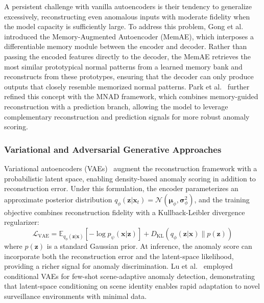 \documentclass[10pt,a4paper]{article}
\begin{document}
A persistent challenge with vanilla autoencoders is their tendency to generalize excessively, reconstructing even anomalous inputs with moderate fidelity when the model capacity is sufficiently large. To address this problem, Gong et al.~\citeyearpar{gong2019memorizing} introduced the Memory-Augmented Autoencoder (MemAE), which interposes a differentiable memory module between the encoder and decoder. Rather than passing the encoded features directly to the decoder, the MemAE retrieves the most similar prototypical normal patterns from a learned memory bank and reconstructs from these prototypes, ensuring that the decoder can only produce outputs that closely resemble memorized normal patterns. Park et al.~\citeyearpar{park2020learning} further refined this concept with the MNAD framework, which combines memory-guided reconstruction with a prediction branch, allowing the model to leverage complementary reconstruction and prediction signals for more robust anomaly scoring.

\subsubsection{Variational and Adversarial Generative Approaches}

Variational autoencoders (VAEs)~\citep{kingma2013auto} augment the reconstruction framework with a probabilistic latent space, enabling density-based anomaly scoring in addition to reconstruction error. Under this formulation, the encoder parameterizes an approximate posterior distribution $q_\phi(\mathbf{z}|\mathbf{x}_t) = \mathcal{N}(\boldsymbol{\mu}_\phi, \boldsymbol{\sigma}_\phi^2)$, and the training objective combines reconstruction fidelity with a Kullback-Leibler divergence regularizer:
\begin{equation}
    \mathcal{L}_{\text{VAE}} = \mathbb{E}_{q_\phi(\mathbf{z}|\mathbf{x})} \left[ -\log p_\psi(\mathbf{x}|\mathbf{z}) \right] + D_{\text{KL}}\left( q_\phi(\mathbf{z}|\mathbf{x}) \| p(\mathbf{z}) \right)
    \label{eq:vae_loss}
\end{equation}
where $p(\mathbf{z})$ is a standard Gaussian prior. At inference, the anomaly score can incorporate both the reconstruction error and the latent-space likelihood, providing a richer signal for anomaly discrimination. Lu et al.~\citeyearpar{lu2020few} employed conditional VAEs for few-shot scene-adaptive anomaly detection, demonstrating that latent-space conditioning on scene identity enables rapid adaptation to novel surveillance environments with minimal data.
\end{document}
